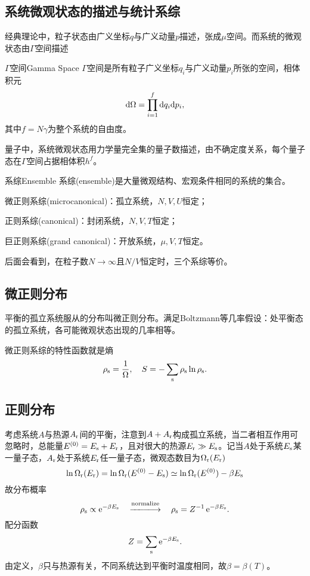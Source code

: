 \subsection{系统微观状态的描述与统计系综}
经典理论中，粒子状态由广义坐标$q$与广义动量$p$描述，张成$\mu$空间。而系统的微观状态由$\varGamma$空间描述
\begin{definition}{$\varGamma$空间}{Gamma Space}
	$\varGamma$空间是所有粒子广义坐标$q_i$与广义动量$p_i$所张的空间，相体积元
	\begin{align}
		\mathop{}\!\mathrm{d}\Omega=\prod_{i=1}^f\mathop{}\!\mathrm{d} q_i\mathrm{d} p_i,
	\end{align}
	其中$f=N\gamma$为整个系统的自由度。
\end{definition}
量子中，系统微观状态用力学量完全集的量子数描述，由不确定度关系，每个量子态在$\varGamma$空间占据相体积$h^f$。
\begin{definition}{系综}{Ensemble}
	系综(ensemble)是大量微观结构、宏观条件相同的系统的集合。
	\begin{compactitem}
		\item 微正则系综(microcanonical)：孤立系统，$N,V,U$恒定；
		\item 正则系综(canonical)：\qquad\quad\enspace 封闭系统，$N,V,T$恒定；
		\item 巨正则系综(grand canonical)：开放系统，$\mu,V,T$恒定。
	\end{compactitem}
\end{definition}
后面会看到，在粒子数$N\to\infty$且$N/V$恒定时，三个系综等价。
\subsection{微正则分布}
平衡的孤立系统服从的分布叫微正则分布。满足Boltzmann等几率假设：处平衡态的孤立系统，各可能微观状态出现的几率相等。

微正则系综的特性函数就是熵
\[
	\rho_\mathrm s=\frac1\Omega,\quad S=-\sum_\mathrm s\rho_\mathrm s\ln\rho_\mathrm s.
\]
\subsection{正则分布}
考虑系统$A$与热源$A_\mathrm r$间的平衡，注意到$A+A_\mathrm r$构成孤立系统，当二者相互作用可忽略时，总能量$E^{(0)}=E_\mathrm s+E_\mathrm r$，且对很大的热源$E_\mathrm r\gg E_\mathrm s$。记当$A$处于系统$E_\mathrm s$某一量子态，$A_\mathrm r$处于系统$E_\mathrm r$任一量子态，微观态数目为$\Omega_\mathrm r(E_\mathrm r)$
\[
	\ln\Omega_\mathrm r(E_\mathrm r)=\ln\Omega_\mathrm r(E^{(0)}-E_\mathrm s)\simeq\ln\Omega_\mathrm r(E^{(0)})-\beta E_\mathrm s
\]
故分布概率
\[
	\rho_\st\propto\e{-\beta E_\st}\normalize\rho_\st=Z^{-1}\e{-\beta E_\st}.
\]
配分函数
\[
	Z=\sum_\mathrm s\mathop{}\!\mathrm{e}^{-\beta E_\mathrm s}.
\]
由定义，$\beta$只与热源有关，不同系统达到平衡时温度相同，故$\beta=\beta(T)$。

